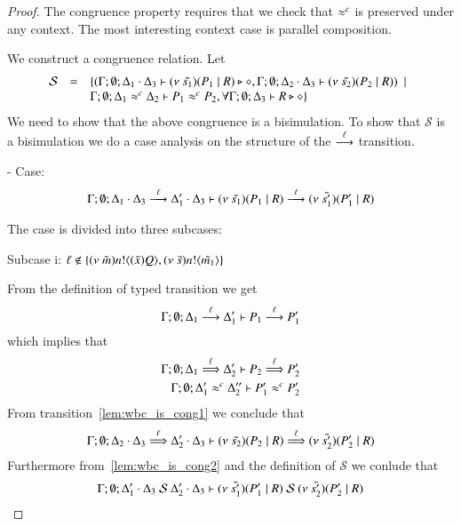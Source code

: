 \begin{proof}

	\noi The congruence property requires that we check that $\approx^{c}$
	is preserved under any context.
	The most interesting context case is parallel composition.

	\noi We construct a congruence relation. Let
	\[
	\begin{array}{rcl}
		\mathcal{S} &=&	\{(\Gamma; \emptyset; \Delta_1 \cdot \Delta_3 \vdash (\nu\ \tilde{s_1})(P_1 \;|\; R) \triangleright \diamond, \Gamma; \emptyset; \Delta_2 \cdot \Delta_3 \vdash (\nu\ \tilde{s_2})(P_2 \;|\; R)) \ \ |\ \  \\
		& &	\Gamma;\emptyset;\Delta_1 \approx^{c} \Delta_2 \vdash P_1 \approx^{c} P_2, \forall \Gamma; \emptyset; \Delta_3 \vdash R \triangleright \diamond\}
	\end{array}
	\]
	\noi We need to show that the above congruence is a bisimulation.
	To show that $\mathcal{S}$ is a bisimulation we do a case analysis on the structure
	of the $\stackrel{\ell}{\longrightarrow}$ transition.


	\noi - Case: 
	\[
		\Gamma; \emptyset; \Delta_1 \cdot \Delta_3 \stackrel{\ell}{\longrightarrow} \Delta_1' \cdot \Delta_3 \vdash (\nu\ \tilde{s_1})(P_1 \;|\; R) \stackrel{\ell}{\longrightarrow} (\nu\ \tilde{s_1'})(P_1' \;|\; R)
	\]

	\noi The case is divided into three subcases:

	\noi Subcase i: $\ell \notin \{(\nu\ \tilde{m}) n ! \langle (\tilde{x}) Q \rangle, (\nu\ \tilde{s}) n ! \langle \tilde{m_1} \rangle\}$

	\noi From the definition of typed transition we get
	\[
		\Gamma; \emptyset; \Delta_1 \stackrel{\ell}{\longrightarrow} \Delta_1' \vdash P_1 \stackrel{\ell}{\longrightarrow} P_1'
	\]
	\noi which implies that
%
	\begin{eqnarray}
		\Gamma; \emptyset; \Delta_1 \stackrel{\ell}{\Longrightarrow} \Delta_2' \vdash P_2 \stackrel{\ell}{\Longrightarrow} P_2' \label{lem:wbc_is_cong1}\\
		\Gamma; \emptyset; \Delta_1' \approx^{c} \Delta_2'' \vdash P_1' \approx^{c} P_2' \label{lem:wbc_is_cong2}
	\end{eqnarray}
%
	\noi From transition~\ref{lem:wbc_is_cong1} we conclude that 
	\[
		\Gamma;\emptyset; \Delta_2 \cdot \Delta_3 \stackrel{\ell}{\Longrightarrow} \Delta_2' \cdot \Delta_3 \vdash (\nu\ \tilde{s_2})(P_2 \;|\; R) \stackrel{\ell}{\Longrightarrow} (\nu\ \tilde{s_2'})(P_2' \;|\; R)
	\]
%
	\noi Furthermore from~\ref{lem:wbc_is_cong2} and the definition of $\mathcal{S}$ we conlude that
	\[
		\Gamma; \emptyset; \Delta_1' \cat \Delta_3\ \mathcal{S}\ \Delta_2' \cat \Delta_3 \proves \newsp{\tilde{s_1'}}{P_1' \Par R}\ \mathcal{S}\ \newsp{\tilde{s_2'}}{P_2' \Par R}
	\]


\end{proof}
